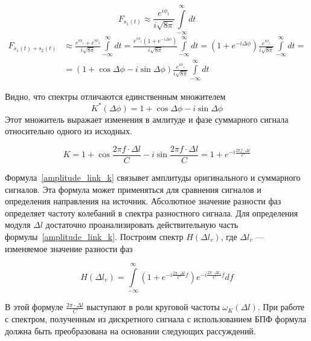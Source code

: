 \documentclass[fleqn,10pt,a4paper]{article}
\begin{document}
\begin{equation*}
	F_{s_1(t)} \approx
                 \frac{e^{i\phi_1}}{i\sqrt{8\pi}}\int\limits_{-\infty}^\infty{}dt
\end{equation*}
\begin{equation*}
	\begin{aligned}
		F_{s_1(t)+s_2(t)} & \approx
	                 \frac{e^{i\phi_1}+e^{i\phi_2}}{i\sqrt{8\pi}}
	                 \int\limits_{-\infty}^\infty dt =
	                 \frac{e^{i\phi_1}\left(1+e^{-i\Delta\phi}\right)}{i\sqrt{8\pi}}
	                 \int\limits_{-\infty}^\infty dt = 
	                 \left(1+e^{-i\Delta\phi}\right)\frac{e^{i\phi_1}}{i\sqrt{8\pi}}
	                 \int\limits_{-\infty}^\infty dt = \\
	               &=\left(1+\cos\Delta\phi-i\sin\Delta\phi\right)\frac{e^{i\phi_1}}{i\sqrt{8\pi}}
	               \int\limits_{-\infty}^\infty dt
	\end{aligned}
\end{equation*}

Видно, что спектры отличаются единственным множителем
\begin{equation*}
K^*(\Delta\phi)=1+\cos\Delta\phi-i\sin\Delta\phi
\end{equation*}
Этот множитель выражает изменения в амлитуде и фазе суммарного сигнала
относительно одного из исходных.

\begin{equation}
	\boxed{
		K=1+\cos\frac{2\pi{}f\cdot\Delta{}l}{C}-i\sin\frac{2\pi{}f\cdot\Delta{}l}{C} =
		1+e^{-i\frac{2\pi{}f\cdot\Delta{}l}{C}} }\label{amplitude_link_k}
\end{equation}

Формула~\ref{amplitude_link_k} связывет амплитуды оригинального и суммарного
сигналов. Эта формула может применяться для сравнения сигналов и определения направления
на источник. Абсолютное значение разности фаз определяет частоту колебаний в
спектра разностного сигнала. Для определения модуля $\Delta{}l$ достаточно
проанализировать действительную часть формулы~\ref{amplitude_link_k}. Построим
спектр $H(\Delta{}l_v)$, где $\Delta{}l_v$ --- изменяемое значение разности фаз

\begin{equation*}
	H(\Delta{}l_v) = \int\limits_{-\infty}^{\infty}
	\left(1+e^{-i\frac{2\pi{}\cdot\Delta{}l}{C}f}\right)e^{-i\frac{2\pi{}\cdot\Delta{}l_v}{C}f}
	df
\end{equation*}

В этой формуле $\frac{2\pi{}\cdot\Delta{}l}{C}$ выступают в роли круговой
частоты $\omega_K(\Delta{}l)$. При работе с спектром, полученным из дискретного
сигнала с использованием БПФ формула должна быть преобразована на основании
следующих рассуждений.
\end{document}
